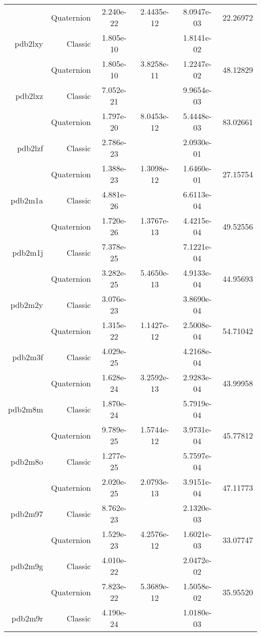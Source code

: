 \begin{xltabular}{\textwidth}{r|rS[table-format=1.3e+2]S[table-format=1.4e+2]S[table-format=1.4e+2]S[table-format=-1.5]}
& Quaternion & 2.240e-22 & 2.4435e-12 & 8.0947e-03 & 22.26972\\  \addlinespace
pdb2lxy & Classic & 1.805e-10 &  & 1.8141e-02 & \\
& Quaternion & 1.805e-10 & 3.8258e-11 & 1.2247e-02 & 48.12829\\  \addlinespace
pdb2lxz & Classic & 7.052e-21 &  & 9.9654e-03 & \\
& Quaternion & 1.797e-20 & 8.0453e-12 & 5.4448e-03 & 83.02661\\  \addlinespace
pdb2lzf & Classic & 2.786e-23 &  & 2.0930e-01 & \\
& Quaternion & 1.388e-23 & 1.3098e-12 & 1.6460e-01 & 27.15754\\  \addlinespace
pdb2m1a & Classic & 4.881e-26 &  & 6.6113e-04 & \\
& Quaternion & 1.720e-26 & 1.3767e-13 & 4.4215e-04 & 49.52556\\  \addlinespace
pdb2m1j & Classic & 7.378e-25 &  & 7.1221e-04 & \\
& Quaternion & 3.282e-25 & 5.4650e-13 & 4.9133e-04 & 44.95693\\  \addlinespace
pdb2m2y & Classic & 3.076e-23 &  & 3.8690e-04 & \\
& Quaternion & 1.315e-22 & 1.1427e-12 & 2.5008e-04 & 54.71042\\  \addlinespace
pdb2m3f & Classic & 4.029e-25 &  & 4.2168e-04 & \\
& Quaternion & 1.628e-24 & 3.2592e-13 & 2.9283e-04 & 43.99958\\  \addlinespace
pdb2m8m & Classic & 1.870e-24 &  & 5.7919e-04 & \\
& Quaternion & 9.789e-25 & 1.5744e-12 & 3.9731e-04 & 45.77812\\  \addlinespace
pdb2m8o & Classic & 1.277e-25 &  & 5.7597e-04 & \\
& Quaternion & 2.020e-25 & 2.0793e-13 & 3.9151e-04 & 47.11773\\  \addlinespace
pdb2m97 & Classic & 8.762e-23 &  & 2.1320e-03 & \\
& Quaternion & 1.529e-23 & 4.2576e-12 & 1.6021e-03 & 33.07747\\  \addlinespace
pdb2m9g & Classic & 4.010e-22 &  & 2.0472e-02 & \\
& Quaternion & 7.823e-22 & 5.3689e-12 & 1.5058e-02 & 35.95520\\  \addlinespace
pdb2m9r & Classic & 4.190e-24 &  & 1.0180e-03 & \\

\end{xltabular}
